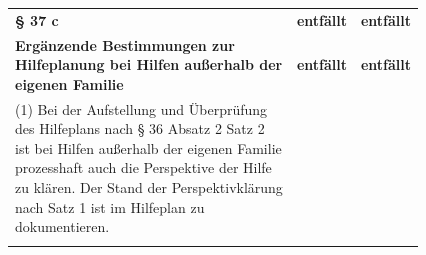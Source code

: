 \documentclass[10pt,a4paper,landscape]{article}
\begin{document}
\begin{longtable}{|L{8.2cm}|L{8.2cm}|L{8.2cm}|}
\hhline{|---|}
\textbf{\textcolor{diffred}{\S{} 37 c}} & \textbf{entfällt} & \textbf{entfällt} \\
\hhline{|---|}
\textbf{\textcolor{diffred}{Ergänzende Bestimmungen zur  \newline Hilfeplanung bei Hilfen außerhalb der  \newline eigenen Familie}} & \textbf{entfällt} & \textbf{entfällt} \\
\hhline{|---|}
\textcolor{diffred}{(1) Bei der Aufstellung und Überprüfung  \newline des Hilfeplans nach \S{} 36 Absatz 2 Satz 2  \newline ist bei Hilfen außerhalb der eigenen Familie  \newline prozesshaft auch die Perspektive der Hilfe  \newline zu klären. Der Stand der Perspektivklärung  \newline nach Satz 1 ist im Hilfeplan zu  \newline dokumentieren. } &  &  \\
\hhline{|---|}

\end{longtable}
\end{document}
